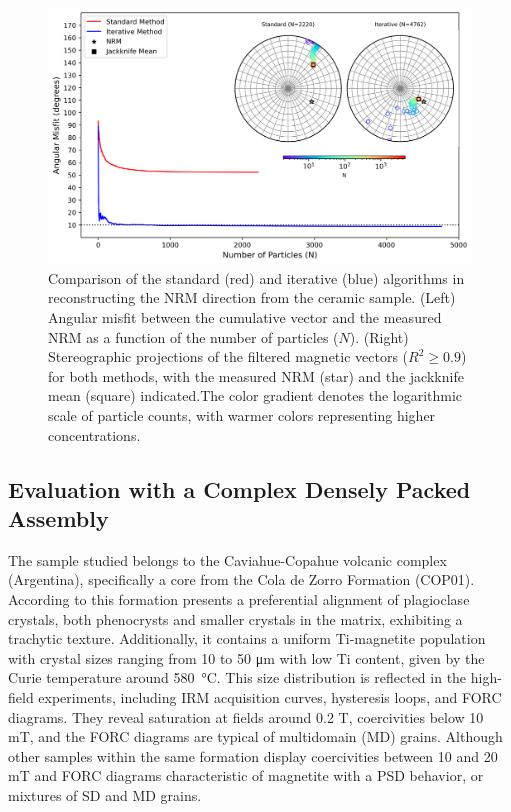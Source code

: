 \begin{figure}[tb!]
  \centering
  \includegraphics[width=1\linewidth]{paper/figures/ceramic-data-stereoplot.png}
  \caption{
  Comparison of the standard (red) and iterative (blue) algorithms in reconstructing the NRM direction from the ceramic sample. (Left) Angular misfit between the cumulative vector and the measured NRM as a function of the number of particles ($N$). (Right) Stereographic projections of the filtered magnetic vectors ($R^2 \geq 0.9$) for both methods, with the measured NRM (star) and the jackknife mean (square) indicated.The color gradient denotes the logarithmic scale of particle counts, with warmer colors representing higher concentrations.
  }
  \label{ceramic-data-stereograms}
\end{figure}

\subsection{Evaluation with a Complex Densely Packed Assembly}

The sample studied belongs to the Caviahue-Copahue volcanic complex (Argentina), specifically a core from the Cola de Zorro Formation (COP01). According to \citet{Moncinhatto2019} this formation presents a preferential alignment of plagioclase crystals, both phenocrysts and smaller crystals in the matrix, exhibiting a trachytic texture. Additionally, it contains a uniform Ti-magnetite population with crystal sizes ranging from 10 to 50 \si{\micro\meter} with low Ti content, given by the Curie temperature around 580~\si{\celsius}. This size distribution is reflected in the high-field experiments, including IRM acquisition curves, hysteresis loops, and FORC diagrams. They reveal saturation at fields around 0.2 \si{T}, coercivities below 10 \si{mT}, and the FORC diagrams are typical of multidomain (MD) grains. Although other samples within the same formation display coercivities between 10 and 20 \si{mT} and FORC diagrams characteristic of magnetite with a PSD behavior, or mixtures of SD and MD grains.

